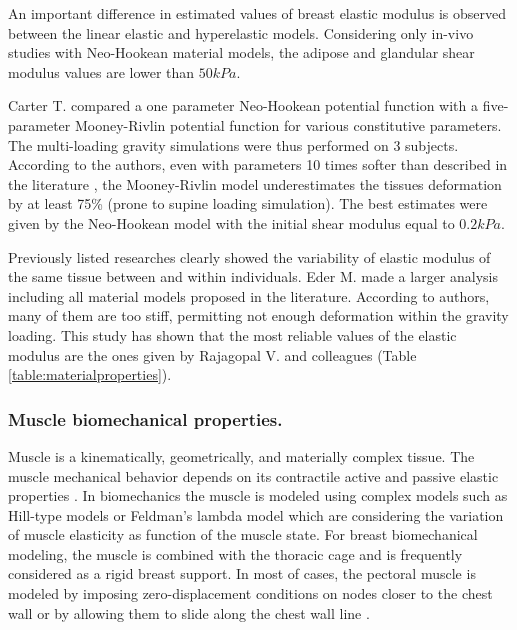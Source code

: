 An important difference in estimated values of breast elastic modulus is observed between the linear elastic and hyperelastic models. Considering only in-vivo studies with Neo-Hookean material models, the adipose and glandular shear modulus values are lower than $50kPa$. 

Carter T. \citep{carter_biomechanical_2009} compared a one parameter Neo-Hookean potential function with a five-parameter Mooney-Rivlin potential function for various constitutive parameters. The multi-loading gravity simulations were thus performed on 3 subjects. According to the authors, even with parameters 10 times softer than described in  the literature \citep{abbas_biomechanical_2001}, the Mooney-Rivlin model underestimates the tissues deformation by at least 75\% (prone to supine loading simulation). The best estimates were given by the Neo-Hookean model with the initial shear modulus equal to $0.2kPa$.  

Previously listed researches clearly showed the variability of elastic modulus of the same tissue between and within individuals. Eder M. \citep{eder_comparison_2014} made a larger analysis including all material models proposed in the literature. According to authors, many of them are too stiff, permitting not enough deformation within the gravity loading. This study has shown that the most reliable values of the elastic modulus are the ones given by Rajagopal V. and colleagues \citep{rajagopal_creating_2008} (Table \ref{table:materialproperties}).

\subsubsection*{Muscle biomechanical properties.} 
Muscle is a kinematically, geometrically, and materially complex tissue. The muscle mechanical behavior depends on its contractile active and passive elastic properties \citep{nordez_muscle_2010}. In biomechanics the muscle is modeled using complex models such as Hill-type models
\citep{zajac_muscle_1989} or Feldman’s lambda model \citep{feldman_once_1986} which are considering the variation of muscle elasticity as function of  the muscle state. For breast biomechanical modeling, the muscle is combined with the thoracic cage and is frequently considered as a rigid breast support. In most of cases, the pectoral muscle is modeled by imposing zero-displacement conditions on nodes closer to the chest wall \citep{abbas_biomechanical_2001,chung_modelling_2008,rajagopal_mapping_2010}  
or by allowing them to slide along the chest wall line \citep{han_nonlinear_2014,georgii_simulation_2016}.   

